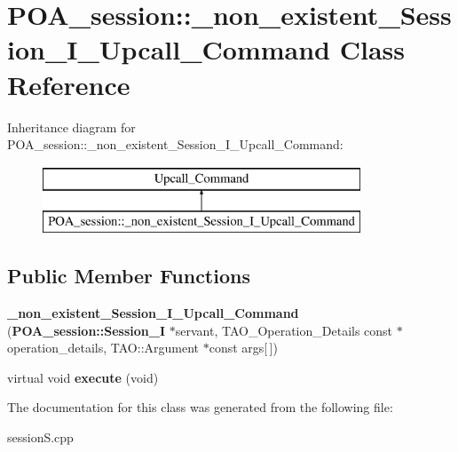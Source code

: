\section{P\+O\+A\+\_\+session\+:\+:\+\_\+non\+\_\+existent\+\_\+\+Session\+\_\+\+I\+\_\+\+Upcall\+\_\+\+Command Class Reference}
\label{classPOA__session_1_1__non__existent__Session__I__Upcall__Command}
Inheritance diagram for P\+O\+A\+\_\+session\+:\+:\+\_\+non\+\_\+existent\+\_\+\+Session\+\_\+\+I\+\_\+\+Upcall\+\_\+\+Command\+:\begin{figure}[H]
\begin{center}
\leavevmode
\includegraphics[height=2.000000cm]{classPOA__session_1_1__non__existent__Session__I__Upcall__Command}
\end{center}
\end{figure}
\subsection*{Public Member Functions}
\begin{DoxyCompactItemize}
\item 
{\bfseries \+\_\+non\+\_\+existent\+\_\+\+Session\+\_\+\+I\+\_\+\+Upcall\+\_\+\+Command} ({\bf P\+O\+A\+\_\+session\+::\+Session\+\_\+I} $\ast$servant, T\+A\+O\+\_\+\+Operation\+\_\+\+Details const $\ast$operation\+\_\+details, T\+A\+O\+::\+Argument $\ast$const args[$\,$])\label{classPOA__session_1_1__non__existent__Session__I__Upcall__Command_adf540f15c71e8df98baa40df39a91e02}

\item 
virtual void {\bfseries execute} (void)\label{classPOA__session_1_1__non__existent__Session__I__Upcall__Command_a4e3e649dac05b9b65dd3f2e3397e0c06}

\end{DoxyCompactItemize}


The documentation for this class was generated from the following file\+:\begin{DoxyCompactItemize}
\item 
session\+S.\+cpp\end{DoxyCompactItemize}
